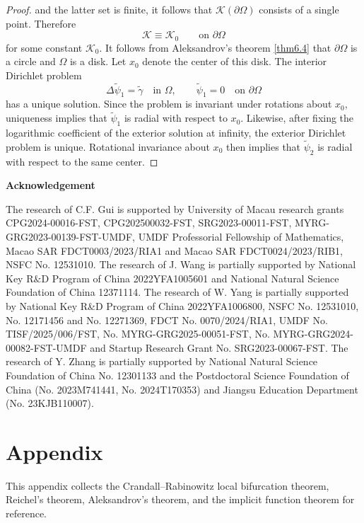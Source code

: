 \documentclass[reqno]{amsart}
\numberwithin{equation}{section}
\numberwithin{equation}{section}
\numberwithin{equation}{section}
\begin{document}
\begin{proof}
 and the latter set is finite, it follows that $\mathcal{K}(\partial\Omega)$ consists of a single point. Therefore
 \[ \mathcal{K}\equiv \mathcal{K}_0 \qquad\text{on }\partial\Omega \]
 for some constant $\mathcal{K}_0$. It follows from Aleksandrov's theorem \ref{thm6.4} that $\partial\Omega$ is a circle and $\Omega$ is a disk. Let $x_0$ denote the center of this disk.
 The interior Dirichlet problem
 \[ \Delta\widetilde{\psi}_{1}= \widetilde{\gamma} \quad\text{in }\Omega, \qquad \widetilde{\psi}_{1}=0 \quad\text{on }\partial\Omega \]
 has a unique solution. Since the problem is invariant under rotations about $x_0$, uniqueness implies that $\widetilde{\psi}_{1}$ is radial with respect to $x_0$. Likewise, after fixing the logarithmic coefficient of the exterior solution at infinity, the exterior Dirichlet problem is unique. Rotational invariance about $x_0$ then implies that $\widetilde{\psi}_{2}$ is radial with respect to the same center.
\end{proof}

\bigskip

\begin{center}
\textbf{Acknowledgement}
\end{center}

The research of C.F. Gui is supported by
University of Macau research grants CPG2024-00016-FST,
CPG202500032-FST, SRG2023-00011-FST, MYRG-GRG2023-00139-FST-UMDF,
UMDF Professorial Fellowship of Mathematics, Macao SAR
FDCT0003/2023/RIA1 and Macao SAR FDCT0024/2023/RIB1, NSFC No.
12531010. The research of J. Wang is partially supported by National
Key R$\&$D Program of China 2022YFA1005601 and National Natural
Science Foundation of China 12371114. The research of W. Yang is
partially supported by National Key R\&D Program of China
2022YFA1006800, NSFC No. 12531010, No. 12171456 and No. 12271369,
FDCT No. 0070/2024/RIA1, UMDF No. TISF/2025/006/FST, No.
MYRG-GRG2025-00051-FST, No. MYRG-GRG2024-00082-FST-UMDF and Startup
Research Grant No. SRG2023-00067-FST. The research of Y. Zhang is
partially supported by National Natural Science Foundation of China
No. 12301133 and the Postdoctoral Science Foundation of China (No.
2023M741441, No. 2024T170353) and Jiangsu Education Department (No.
23KJB110007).



\section{Appendix}

This appendix collects the Crandall--Rabinowitz local bifurcation theorem, Reichel's theorem, Aleksandrov's theorem, and the implicit function theorem for reference.
\end{document}
